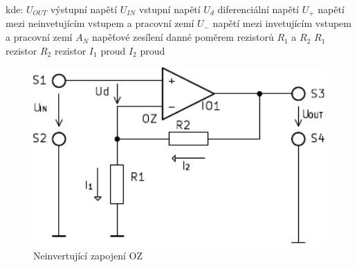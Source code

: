     \clearpage
    \hspace*{2cm}kde:\newline    
    \hspace*{4cm}$U_{OUT}$ \dotfill výstupní napětí\hspace*{4cm}\newline
    \hspace*{4cm}$U_{IN}$ \dotfill vstupní napětí\hspace*{4cm}\newline
    \hspace*{4cm}$U_d$ \dotfill diferenciální napětí\hspace*{4cm}\newline    
    \hspace*{4cm}$U_+$ \dotfill napětí mezi neinvetujícím vstupem a pracovní zemí\hspace*{4cm}\newline
  	\hspace*{4cm}$U_-$ \dotfill napětí mezi invetujícím vstupem a pracovní zemí\hspace*{4cm}\newline
  	\hspace*{4cm}$A_N$ \dotfill napěťové zesílení danné poměrem rezistorů $R_1$ a $R_2$\hspace*{4cm}\newline
  	\hspace*{4cm}$R_1$ \dotfill rezistor\hspace*{4cm}\newline
  	\hspace*{4cm}$R_2$ \dotfill rezistor\hspace*{4cm}\newline
  	\hspace*{4cm}$I_1$ \dotfill proud\hspace*{4cm}\newline
  	\hspace*{4cm}$I_2$ \dotfill proud\hspace*{4cm}\newline
  	
    
    \begin{figure}[H]
		  \centering
		  \includegraphics[width=12cm]{../img/nei.pdf}
		  \caption{Neinvertující zapojení OZ}
		  \label{sch:nei}
  	\end{figure}
  
